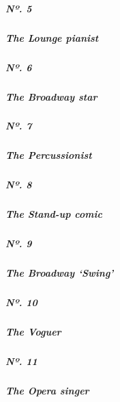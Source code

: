 \href{https://www.nytimes3xbfgragh.onion/interactive/2019/05/30/magazine/earl-rose-piano-carlyle-new-york.html}{}

\hypertarget{nuxba-5}{%
\subparagraph{Nº. 5}\label{nuxba-5}}

\hypertarget{the-lounge-pianist}{%
\subparagraph{The Lounge pianist}\label{the-lounge-pianist}}

\href{https://www.nytimes3xbfgragh.onion/interactive/2019/05/30/magazine/broadway-kiss-me-kate.html}{}

\hypertarget{nuxba-6}{%
\subparagraph{Nº. 6}\label{nuxba-6}}

\hypertarget{the-broadway-star}{%
\subparagraph{The Broadway star}\label{the-broadway-star}}

\href{https://www.nytimes3xbfgragh.onion/interactive/2019/05/30/magazine/latin-beat-new-york.html}{}

\hypertarget{nuxba-7}{%
\subparagraph{Nº. 7}\label{nuxba-7}}

\hypertarget{the-percussionist}{%
\subparagraph{The Percussionist}\label{the-percussionist}}

\href{https://www.nytimes3xbfgragh.onion/interactive/2019/05/30/magazine/female-comedy-new-york.html}{}

\hypertarget{nuxba-8}{%
\subparagraph{Nº. 8}\label{nuxba-8}}

\hypertarget{the-stand-up-comic}{%
\subparagraph{The Stand-up comic}\label{the-stand-up-comic}}

\href{https://www.nytimes3xbfgragh.onion/interactive/2019/05/30/magazine/aladdin-musical-new-york.html}{}

\hypertarget{nuxba-9}{%
\subparagraph{Nº. 9}\label{nuxba-9}}

\hypertarget{the-broadway-swing}{%
\subparagraph{The Broadway `Swing'}\label{the-broadway-swing}}

\href{https://www.nytimes3xbfgragh.onion/interactive/2019/05/30/magazine/vogue-kiki-new-york.html}{}

\hypertarget{nuxba-10}{%
\subparagraph{Nº. 10}\label{nuxba-10}}

\hypertarget{the-voguer}{%
\subparagraph{The Voguer}\label{the-voguer}}

\href{https://www.nytimes3xbfgragh.onion/interactive/2019/05/30/magazine/metropolitan-opera-singer-new-york.html}{}

\hypertarget{nuxba-11}{%
\subparagraph{Nº. 11}\label{nuxba-11}}

\hypertarget{the-opera-singer}{%
\subparagraph{The Opera singer}\label{the-opera-singer}}

